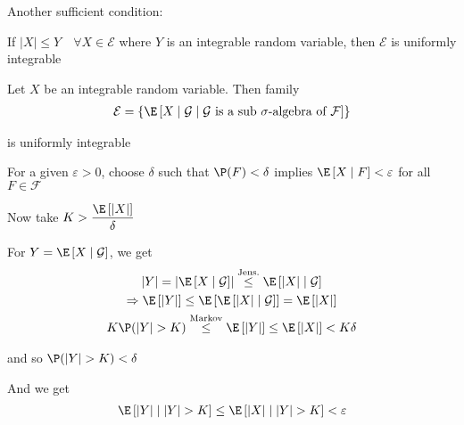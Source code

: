 \noindent Another sufficient condition:
\par\bigskip
\begin{lem}[]{}
  If $\left|X\right|\leq Y\quad\forall X\in\mathcal{E}$ where $Y$ is an integrable random variable, then $\mathcal{E}$ is uniformly integrable
\end{lem}
\par\bigskip
\begin{theo}[]{}
  Let $X$ be an integrable random variable. Then family
  \begin{equation*}
    \begin{gathered}
      \mathcal{E} = \left\{\E\left[X\mid\mathcal{G}\mid\mathcal{G}\text{ is a sub $\sigma$-algebra of } \mathcal{F}\right]\right\}
    \end{gathered}
  \end{equation*}\par
  \noindent is uniformly integrable
\end{theo}
\par\bigskip
\begin{prf}[]{}
  For a given $\varepsilon>0$, choose $\delta$ such that $\P(F)<\delta$ implies $\E\left[X\mid F\right]<\varepsilon$ for all $F\in\mathcal{F}$\par
  \noindent Now take $K>\dfrac{\E\left[\left|X\right|\right]}{\delta}$
  \par\bigskip
  \noindent For $Y = \E\left[X\mid\mathcal{G}\right]$, we get
  \begin{equation*}
    \begin{gathered}
      \left|Y\right| = \left|\E\left[X\mid\mathcal{G}\right]\right|\stackrel{\text{Jens.}}{\leq}\E\left[\left|X\right|\mid\mathcal{G}\right]\\
      \Rightarrow \E\left[\left|Y\right|\right] \leq \E\left[\E\left[\left|X\right|\mid\mathcal{G}\right]\right] = \E\left[\left|X\right|\right]\\
      K\P(\left|Y\right|>K)\stackrel{\text{Markov}}{\leq}\E\left[\left|Y\right|\right]\leq \E\left[\left|X\right|\right]<K\delta
    \end{gathered}
  \end{equation*}\par
  \noindent and so $\P(\left|Y\right|>K)<\delta$
  \par\bigskip
  \noindent And we get
  \begin{equation*}
    \begin{gathered}
      \E\left[\left|Y\right|\mid\left|Y\right|>K\right]\leq \E\left[\left|X\right|\mid\left|Y\right|>K\right]<\varepsilon
    \end{gathered}
  \end{equation*}
\end{prf}

